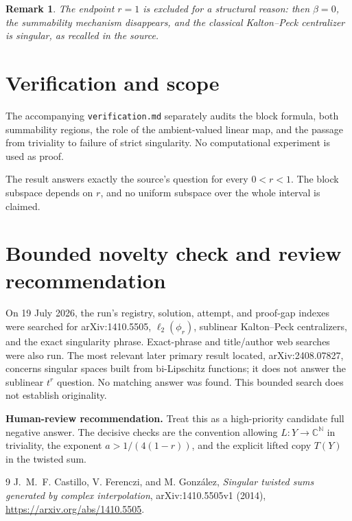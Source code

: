 \documentclass[11pt]{article}
\newtheorem{remark}{Remark}
\begin{document}
\begin{remark}
The endpoint $r=1$ is excluded for a structural reason: then $\beta=0$, the
summability mechanism disappears, and the classical Kalton--Peck centralizer
is singular, as recalled in the source.
\end{remark}

\section{Verification and scope}

The accompanying \texttt{verification.md} separately audits the block formula,
both summability regions, the role of the ambient-valued linear map, and the
passage from triviality to failure of strict singularity.  No computational
experiment is used as proof.

The result answers exactly the source's question for every $0<r<1$.  The block
subspace depends on $r$, and no uniform subspace over the whole interval is
claimed.

\section{Bounded novelty check and review recommendation}

On 19 July 2026, the run's registry, solution, attempt, and proof-gap indexes
were searched for arXiv:1410.5505, $\ell_2(\phi_r)$, sublinear Kalton--Peck
centralizers, and the exact singularity phrase.  Exact-phrase and title/author
web searches were also run.  The most relevant later primary result located,
arXiv:2408.07827, concerns singular spaces built from bi-Lipschitz functions;
it does not answer the sublinear $t^r$ question.  No matching answer was found.
This bounded search does not establish originality.

\medskip
\noindent\textbf{Human-review recommendation.}
Treat this as a high-priority candidate full negative answer.  The decisive
checks are the convention allowing $L:Y\to\mathbb C^{\mathbb N}$ in triviality,
the exponent $a>1/(4(1-r))$, and the explicit lifted copy $T(Y)$ in the twisted
sum.

\begin{thebibliography}{9}
J.~M.~F. Castillo, V. Ferenczi, and M. Gonz\'alez,
\emph{Singular twisted sums generated by complex interpolation},
arXiv:1410.5505v1 (2014),
\url{https://arxiv.org/abs/1410.5505}.
\end{thebibliography}
\end{document}
